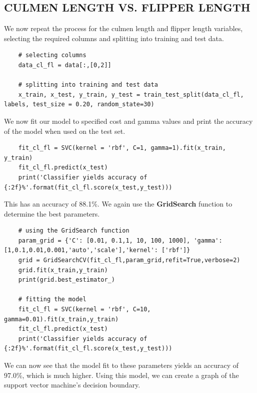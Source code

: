 \documentclass[12pt]{article}
\begin{document}
\subsection{CULMEN LENGTH VS. FLIPPER LENGTH}

We now repeat the process for the culmen length and flipper length variables, selecting the required columns and splitting into training and test data.

\begin{verbatim}
    # selecting columns
    data_cl_fl = data[:,[0,2]]

    # splitting into training and test data
    x_train, x_test, y_train, y_test = train_test_split(data_cl_fl, labels, test_size = 0.20, random_state=30)
\end{verbatim}

We now fit our model to specified cost and gamma values and print the accuracy of the model when used on the test set.

\begin{verbatim}
    fit_cl_fl = SVC(kernel = 'rbf', C=1, gamma=1).fit(x_train, y_train)
    fit_cl_fl.predict(x_test)
    print('Classifier yields accuracy of {:2f}%'.format(fit_cl_fl.score(x_test,y_test)))  
\end{verbatim}

This has an accuracy of 88.1\%. We again use the \textbf{GridSearch} function to determine the best parameters.

\begin{verbatim}
    # using the GridSearch function
    param_grid = {'C': [0.01, 0.1,1, 10, 100, 1000], 'gamma': [1,0.1,0.01,0.001,'auto','scale'],'kernel': ['rbf']}
    grid = GridSearchCV(fit_cl_fl,param_grid,refit=True,verbose=2)
    grid.fit(x_train,y_train)
    print(grid.best_estimator_)
    
    # fitting the model
    fit_cl_fl = SVC(kernel = 'rbf', C=10, gamma=0.01).fit(x_train,y_train)
    fit_cl_fl.predict(x_test)
    print('Classifier yields accuracy of {:2f}%'.format(fit_cl_fl.score(x_test,y_test)))
\end{verbatim}

We can now see that the model fit to these parameters yields an accuracy of 97.0\%, which is much higher. Using this model, we can create a graph of the support vector machine's decision boundary.
\end{document}
